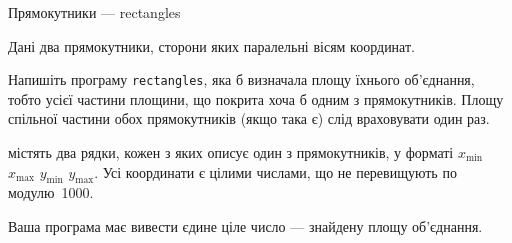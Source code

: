 \begin{problemAllDefault}{Прямокутники --- rectangles}

Дані два прямокутники, сторони яких паралельні вісям координат.

\Task Напишіть програму \texttt{rectangles}, яка б визначала площу їхнього об’єднання, тобто усієї частини площини, що покрита хоча б одним з прямокутників. Площу спільної частини обох прямокутників (якщо така є) слід враховувати один раз.

\InputFile містять два рядки, кожен з яких описує один з прямокутників, у форматі $x_{\min}$ $x_{\max}$ $y_{\min}$ $y_{\max}$. Усі координати є цілими числами, що не перевищують по модулю~1000.

\OutputFile Ваша програма має вивести єдине ціле число --- знайдену площу об’єднання.



\Examples

\begin{exampleSimple}{6em}{4em}%
%
%
\end{exampleSimple}
\begin{exampleSimple}{6em}{4em}%
%
\end{exampleSimple}
{}%



\end{problemAllDefault}